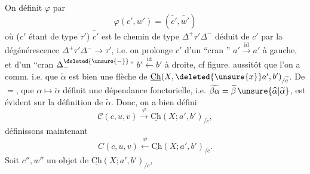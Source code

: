 On définit $\varphi$ par
\[
\boxed{\varphi(c',w')=(\widetilde{c'},\widetilde{w'})}
\]
où ($c'$ étant de type $\tau'$) $\widetilde{c'}$ est le chemin de type $\Delta^+\tau'\Delta^-$ déduit de \deleted{$\unsure{\varphi}$} $c'$  par la dégénérescence $\Delta^+\tau'\Delta^-\to\tau'$, i.e. on prolonge $c'$ d'un ``cran \inserted{$\Delta_+^{\deleted{\unsure{+}}}$}'' $a'\xrightarrow{\mathrm{id}}a'$ à gauche, et d'un ``cran $\Delta_-^{\deleted{\unsure{-}}}$'' $b'\xleftarrow{\mathrm{id}}b'$ à droite, cf figure.
aussitôt que l'on a comm. 
i.e. que $\widetilde\alpha$ est bien une flèche de $\underline{\mathrm{Ch}}(X,\deleted{\unsure{x}}a',b')_{/\widetilde c}$. De $=$, que $\alpha\mapsto\widetilde\alpha$ définit une dépendance fonctorielle, i.e. $\widetilde{\beta\alpha}=\widetilde\beta\,\unsure{\widehat\alpha|\widetilde\alpha}$, est évident sur la définition de $\widetilde\alpha$.  Donc, on a bien défini
\[
\mathcal C(c,u,v)\xrightarrow{\varphi}\underline{\mathrm{Ch}}(X;a',b')_{/\widetilde c},
\]
définissons maintenant
\[
C(c,u,v)\xleftarrow{\psi}\underline{\mathrm{Ch}}(X;a',b')_{/\widetilde c}.
\]
Soit $c'',w''$ un objet de $\underline{\mathrm{Ch}}(X;a',b')_{/\widetilde c}$,
